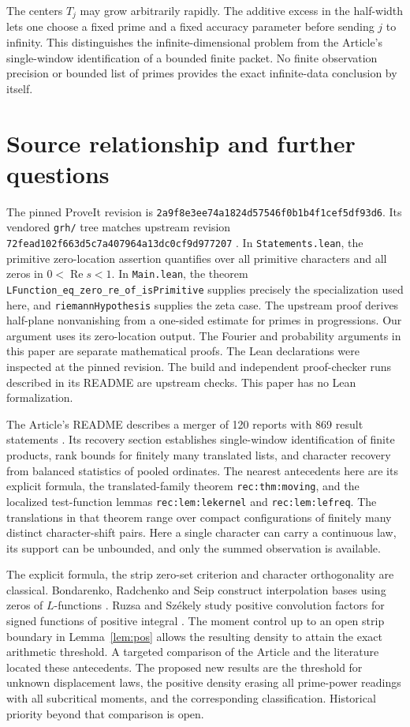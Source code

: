 \documentclass[11pt]{article}
\newcommand{\Real}{\operatorname{Re}}
\begin{document}
The centers \(T_j\) may grow arbitrarily rapidly. The additive excess in the half-width lets one choose a fixed prime and a fixed accuracy parameter before sending \(j\) to infinity. This distinguishes the infinite-dimensional problem from the Article's single-window identification of a bounded finite packet. No finite observation precision or bounded list of primes provides the exact infinite-data conclusion by itself.

\section{Source relationship and further questions}
The pinned ProveIt revision is \texttt{2a9f8e3ee74a1824d57546f0b1b4f1cef5df93d6}. Its vendored \texttt{grh/} tree matches upstream revision \texttt{72fead102f663d5c7a407964a13dc0cf9d977207} \cite{lean}. In \texttt{Statements.lean}, the primitive zero-location assertion quantifies over all primitive characters and all zeros in \(0<\Real s<1\). In \texttt{Main.lean}, the theorem \texttt{LFunction\_eq\_zero\_re\_of\_isPrimitive} supplies precisely the specialization used here, and \texttt{riemannHypothesis} supplies the zeta case. The upstream proof derives half-plane nonvanishing from a one-sided estimate for primes in progressions. Our argument uses its zero-location output. The Fourier and probability arguments in this paper are separate mathematical proofs. The Lean declarations were inspected at the pinned revision. The build and independent proof-checker runs described in its README are upstream checks. This paper has no Lean formalization.

The Article's README describes a merger of 120 reports with 869 result statements \cite{article}. Its recovery section establishes single-window identification of finite products, rank bounds for finitely many translated lists, and character recovery from balanced statistics of pooled ordinates. The nearest antecedents here are its explicit formula, the translated-family theorem \texttt{rec:thm:moving}, and the localized test-function lemmas \texttt{rec:lem:lekernel} and \texttt{rec:lem:lefreq}. The translations in that theorem range over compact configurations of finitely many distinct character-shift pairs. Here a single character can carry a continuous law, its support can be unbounded, and only the summed observation is available.

The explicit formula, the strip zero-set criterion and character orthogonality are classical. Bondarenko, Radchenko and Seip construct interpolation bases using zeros of \(L\)-functions \cite{brs}. Ruzsa and Sz\'ekely study positive convolution factors for signed functions of positive integral \cite{rs}. The moment control up to an open strip boundary in Lemma~\ref{lem:pos} allows the resulting density to attain the exact arithmetic threshold. A targeted comparison of the Article and the literature located these antecedents. The proposed new results are the threshold for unknown displacement laws, the positive density erasing all prime-power readings with all subcritical moments, and the corresponding classification. Historical priority beyond that comparison is open.
\end{document}
